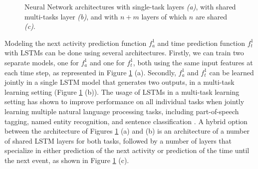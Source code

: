 \documentclass[runningheads,a4paper]{llncs}
\begin{document}
\begin{figure}[t]
{
	}
	\caption{Neural Network architectures with single-task layers \emph{(a)}, with shared multi-tasks layer \emph{(b)}, and with $n+m$ layers of which $n$ are shared \emph{(c)}.}
	\label{fig:rnn_architectures}
	\vspace{-0.3cm}
\end{figure}

Modeling the next activity prediction function $f_a^1$ and time prediction function $f_t^1$ with LSTMs can be done using several architectures. Firstly, we can train two separate models, one for $f_a^1$ and one for $f_t^1$, both using the same input features at each time step, as represented in Figure \ref{fig:rnn_architectures} (a). Secondly, $f_a^1$ and $f_t^1$ can be learned jointly in a single LSTM model that generates two outputs, in a multi-task learning setting \cite{Caruana1997} (Figure \ref{fig:rnn_architectures} (b)). The usage of LSTMs in a multi-task learning setting has shown to improve performance on all individual tasks when jointly learning multiple natural language processing tasks, including part-of-speech tagging, named entity recognition, and sentence classification \cite{Collobert2008}. A hybrid option between the architecture of Figures \ref{fig:rnn_architectures} (a) and (b) is an architecture of a number of shared LSTM layers for both tasks, followed by a number of layers that specialize in either prediction of the next activity or prediction of the time until the next event, as shown in Figure \ref{fig:rnn_architectures} (c).
\end{document}
